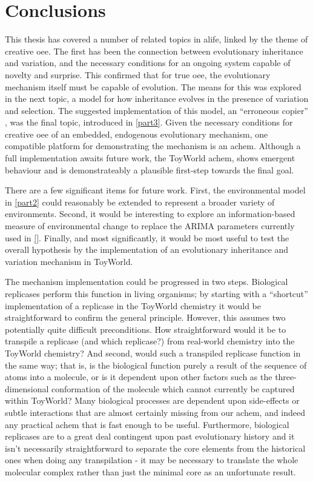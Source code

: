 \chapter{Conclusions}\label{conclusions}

This thesis has covered a number of related topics in \gls{alife}, linked by the theme of creative \gls{oee}. The first has been the connection between evolutionary inheritance and variation, and the necessary conditions for an ongoing system capable of novelty and surprise. This confirmed that for true \gls{oee}, the evolutionary mechanism itself must be capable of evolution. The means for this was explored in the next topic, a model for how inheritance evolves in the presence of variation and selection. The suggested implementation of this model, an ``erroneous copier'' \parencite{}, was the final topic, introduced in \cref{part3}. Given the necessary conditions for creative \gls{oee} of an embedded, endogenous evolutionary mechanism, one compatible platform for demonstrating the mechanism is an \gls{achem}. Although a full implementation awaits future work, the ToyWorld \gls{achem}, shows emergent behaviour and is demonstrateably a plausible first-step towards the final goal.

There are a few significant items for future work. First, the environmental model in \cref{part2} could reasonably be extended to represent a broader variety of environments. Second, it would be interesting to explore an information-based measure of environmental change to replace the ARIMA parameters currently used in \cref{}. Finally, and most significantly, it would be most useful to test the overall hypothesis by the implementation of an evolutionary inheritance and variation mechanism in ToyWorld.

The mechanism implementation could be progressed in two steps. Biological replicases perform this function in living organisms; by starting with a ``shortcut'' implementation of a replicase in the ToyWorld chemistry it would be straightforward to confirm the general principle. However, this assumes two potentially quite difficult preconditions. How straightforward would it be to transpile a replicase (and which replicase?) from real-world chemistry into the ToyWorld chemistry? And second, would such a transpiled replicase function in the same way; that is, is the biological function purely a result of the sequence of atoms into a molecule, or is it dependent upon other factors such as the three-dimensional conformation of the molecule which cannot currently be captured within ToyWorld? Many biological processes are dependent upon side-effects or subtle interactions that are almost certainly missing from our \gls{achem}, and indeed any practical \gls{achem} that is fast enough to be useful. Furthermore, biological replicases are to a great deal contingent upon past evolutionary history and it isn't necessarily straightforward to separate the core elements from the historical ones when doing any transpilation - it may be necessary to translate the whole molecular complex rather than just the minimal core as an unfortunate result.

